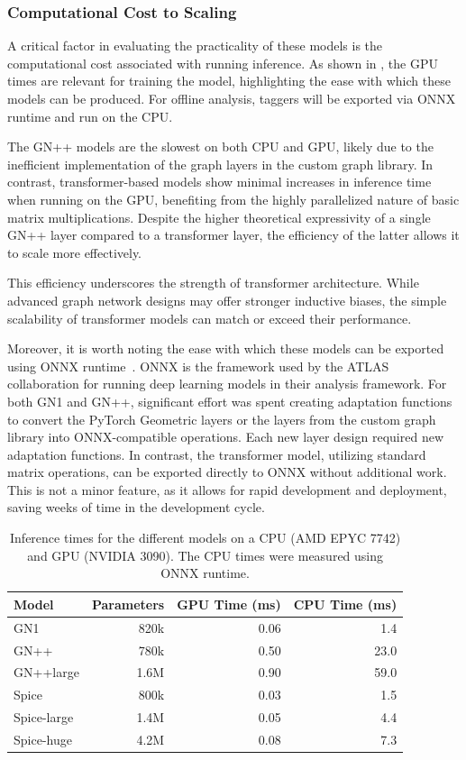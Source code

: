 \FloatBarrier

\subsubsection{Computational Cost to Scaling}

A critical factor in evaluating the practicality of these models is the computational cost associated with running inference.
As shown in , the GPU times are relevant for training the model, highlighting the ease with which these models can be produced. For offline analysis, taggers will be exported via ONNX runtime and run on the CPU\@.

The GN++ models are the slowest on both CPU and GPU, likely due to the inefficient implementation of the graph layers in the custom graph library.
In contrast, transformer-based models show minimal increases in inference time when running on the GPU, benefiting from the highly parallelized nature of basic matrix multiplications.
Despite the higher theoretical expressivity of a single GN++ layer compared to a transformer layer, the efficiency of the latter allows it to scale more effectively.

This efficiency underscores the strength of transformer architecture.
While advanced graph network designs may offer stronger inductive biases, the simple scalability of transformer models can match or exceed their performance.

Moreover, it is worth noting the ease with which these models can be exported using ONNX runtime~\cite{onnxruntime}.
ONNX is the framework used by the ATLAS collaboration for running deep learning models in their analysis framework.
For both GN1 and GN++, significant effort was spent creating adaptation functions to convert the PyTorch Geometric layers or the layers from the custom graph library into ONNX-compatible operations.
Each new layer design required new adaptation functions.
In contrast, the transformer model, utilizing standard matrix operations, can be exported directly to ONNX without additional work.
This is not a minor feature, as it allows for rapid development and deployment, saving weeks of time in the development cycle.

\begin{table}[h!]
    \centering
    \begin{tabular}{lrrr}
        \toprule
        Model & Parameters & GPU Time (ms) & CPU Time (ms) \\
        \midrule
        GN1 & 820k & 0.06 & 1.4 \\
        GN++ & 780k & 0.50 & 23.0 \\
        GN++large & 1.6M & 0.90 & 59.0 \\
        Spice & 800k & 0.03 & 1.5 \\
        Spice-large & 1.4M & 0.05 & 4.4 \\
        Spice-huge & 4.2M & 0.08 & 7.3 \\
        \bottomrule
    \end{tabular}
    \caption{Inference times for the different models on a CPU (AMD EPYC 7742) and GPU (NVIDIA 3090). The CPU times were measured using ONNX runtime.}
    \label{tab:inference}
\end{table}

